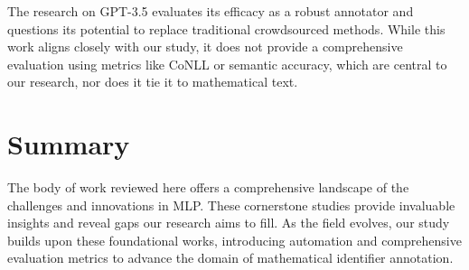 The research on GPT-3.5 evaluates its efficacy as a robust annotator and questions its potential to replace traditional crowdsourced methods. While this work aligns closely with our study, it does not provide a comprehensive evaluation using metrics like CoNLL or semantic accuracy, which are central to our research, nor does it tie it to mathematical text.

\section{Summary}

The body of work reviewed here offers a comprehensive landscape of the challenges and innovations in MLP. These cornerstone studies provide invaluable insights and reveal gaps our research aims to fill. As the field evolves, our study builds upon these foundational works, introducing automation and comprehensive evaluation metrics to advance the domain of mathematical identifier annotation.
